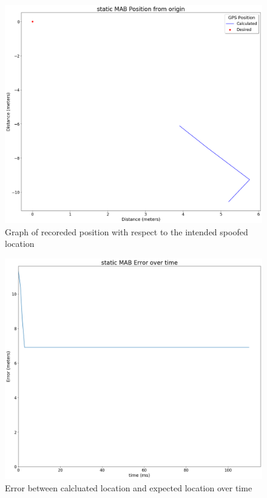 \begin{figure}[h]
    \begin{centering}
        \includegraphics[width=14cm,keepaspectratio]{Figures/2021_3_30_static_MAB Position from origin.png}
        \caption{Graph of recoreded position with respect to the intended spoofed location}
        \label{fig:MABStaticPosition}
    \end{centering}
\end{figure}

\begin{figure}[h]
    \begin{centering}
        \includegraphics[width=14cm,keepaspectratio]{Figures/2021_3_30_static_MAB error over time.png}
        \caption{Error between calcluated location and expected location over time}
        \label{fig:MABStaticError}
    \end{centering}
\end{figure}

